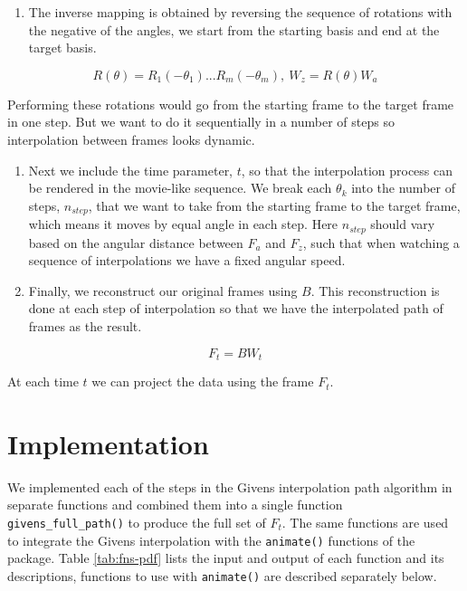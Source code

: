 \begin{enumerate}
\def\labelenumi{\arabic{enumi}.}
\setcounter{enumi}{3}
\tightlist
\item
  The inverse mapping is obtained by reversing the sequence of rotations with the negative of the angles, we start from the starting basis and end at the target basis.
\end{enumerate}

\[R(\theta) = R_1(-\theta_1) ... R_m(-\theta_m), \    W_z = R(\theta)W_a\]

Performing these rotations would go from the starting frame to the target frame in one step. But we want to do it sequentially in a number of steps so interpolation between frames looks dynamic.

\begin{enumerate}
\def\labelenumi{\arabic{enumi}.}
\setcounter{enumi}{4}
\item
  Next we include the time parameter, \(t\), so that the interpolation process can be rendered in the movie-like sequence. We break each \(\theta_k\) into the number of steps, \(n_{step}\), that we want to take from the starting frame to the target frame, which means it moves by equal angle in each step. Here \(n_{step}\) should vary based on the angular distance between \(F_a\) and \(F_z\), such that when watching a sequence of interpolations we have a fixed angular speed.
\item
  Finally, we reconstruct our original frames using \(B\). This reconstruction is done at each step of interpolation so that we have the interpolated path of frames as the result.
\end{enumerate}

\[F_t = B  W_t\]

At each time \(t\) we can project the data using the frame \(F_t\).

\hypertarget{implementation}{%
\section{Implementation}\label{implementation}}

We implemented each of the steps in the Givens interpolation path algorithm in separate functions and combined them into a single function \texttt{givens\_full\_path()} to produce the full set of \(F_t\). The same functions are used to integrate the Givens interpolation with the \texttt{animate()} functions of the  package. Table \ref{tab:fns-pdf} lists the input and output of each function and its descriptions, functions to use with \texttt{animate()} are described separately below.

